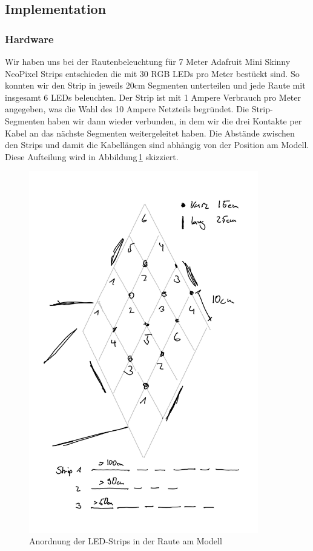     \subsection{Implementation}

        \subsubsection{Hardware}

            Wir haben uns bei der Rautenbeleuchtung für 7 Meter Adafruit Mini Skinny NeoPixel Strips entschieden die mit 30 RGB LEDs pro Meter bestückt sind. So konnten wir den Strip in jeweils 20cm Segmenten unterteilen und jede Raute mit insgesamt 6 LEDs beleuchten.
            Der Strip ist mit 1 Ampere Verbrauch pro Meter angegeben, was die Wahl des 10 Ampere Netzteils begründet.
            Die Strip-Segmenten haben wir dann wieder verbunden, in dem wir die drei Kontakte per Kabel an das nächste Segmenten weitergeleitet haben. Die Abstände zwischen den Strips und damit die Kabellängen sind abhängig von der Position am Modell.
            Diese Aufteilung wird in Abbildung\,\ref{fig:led_wiring_rhombus} skizziert.

            \begin{figure}[H]
                \begin{center}
                    \includegraphics[width=10cm]{media/03_technical_implementation/leds_3.png}
                \end{center}
                \caption{Anordnung der LED-Strips in der Raute am Modell}
                \label{fig:led_wiring_rhombus}
            \end{figure}
            

